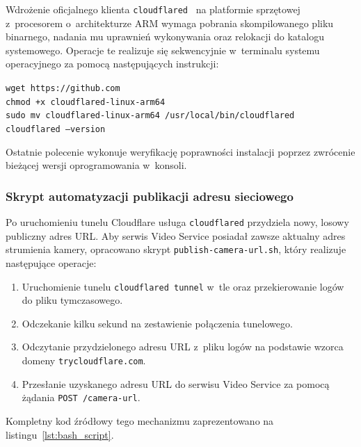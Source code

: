 \documentclass[a4paper,12pt,reqno]{article}
\begin{document}
Wdrożenie oficjalnego klienta \texttt{cloudflared}~\cite{cloudflare} na platformie sprzętowej z~procesorem o~architekturze ARM wymaga pobrania skompilowanego pliku binarnego, nadania mu uprawnień wykonywania oraz relokacji do katalogu systemowego. Operacje te realizuje się sekwencyjnie w~terminalu systemu operacyjnego za pomocą następujących instrukcji:
\begin{center}
	\texttt{wget https://github.com} \\
	\texttt{chmod +x cloudflared-linux-arm64} \\
	\texttt{sudo mv cloudflared-linux-arm64 /usr/local/bin/cloudflared} \\
	\texttt{cloudflared --version}
\end{center}
Ostatnie polecenie wykonuje weryfikację poprawności instalacji poprzez zwrócenie bieżącej wersji oprogramowania w~konsoli.

\subsubsection{Skrypt automatyzacji publikacji adresu sieciowego}

Po uruchomieniu tunelu Cloudflare usługa \texttt{cloudflared} przydziela nowy, losowy publiczny adres URL. Aby serwis Video Service posiadał zawsze aktualny adres strumienia kamery, opracowano skrypt \texttt{publish-camera-url.sh}, który realizuje następujące operacje:

\begin{enumerate}
	\item Uruchomienie tunelu \texttt{cloudflared tunnel} w~tle oraz przekierowanie logów do pliku tymczasowego.
	
	\item Odczekanie kilku sekund na zestawienie połączenia tunelowego.
	
	\item Odczytanie przydzielonego adresu URL z~pliku logów na podstawie wzorca domeny \texttt{trycloudflare.com}.
	
	\item Przesłanie uzyskanego adresu URL do serwisu Video Service za pomocą żądania \texttt{POST /camera-url}.
\end{enumerate}

Kompletny kod źródłowy tego mechanizmu zaprezentowano na listingu~\ref{lst:bash_script}.
\end{document}
